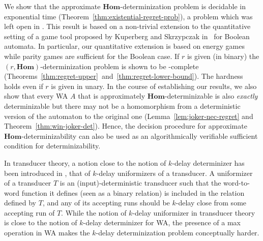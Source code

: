 We show that the approximate $\mathbf{Hom}$-determinization problem is
decidable in exponential time (Theorem~\ref{thm:existential-regret-prob}), a
problem which was left open in \cite{akl10}. This result is based on a
non-trivial extension to the quantitative setting of a game tool proposed by
Kuperberg and Skrzypczak in~\cite{ks15} for Boolean automata. In particular, our
quantitative extension is based on energy games~\cite{bflms08} while parity
games are sufficient for the Boolean case.  If $r$ is given (in
binary) the $(r,\mathbf{Hom})$-determinization problem is shown to be
\EXP-complete
(Theorems~\ref{thm:regret-upper}~and~\ref{thm:regret-lower-bound}). The hardness
holds even if $r$ is given in unary.  In the course of establishing our results,
we also show that every WA $A$ that is approximately
$\mathbf{Hom}$-determinizable is also {\em exactly} determinizable but there
may not be a homomorphism from a deterministic version of the automaton to the
original one (Lemma~\ref{lem:joker-nec-regret} and
Theorem~\ref{thm:win-joker-det}). Hence, the decision procedure for approximate
$\mathbf{Hom}$-determinizability can also be used as an algorithmically
verifiable sufficient condition for determinizability. 

In transducer theory, a notion close to the notion of $k$-delay
determinizer has been introduced in \cite{fjlw16}, that of $k$-delay
uniformizers of a transducer. A uniformizer of a transducer $T$ is an
(input)-deterministic transducer such that the word-to-word function it defines
(seen as a binary relation) is included in the relation defined by
$T$, and any of its accepting runs should be $k$-delay close from some
accepting run of $T$. While the notion of $k$-delay uniformizer in
transducer theory is close to the notion of $k$-delay determinizer for
WA, the presence of a max operation in WA makes the $k$-delay
determinization problem conceptually harder. 
